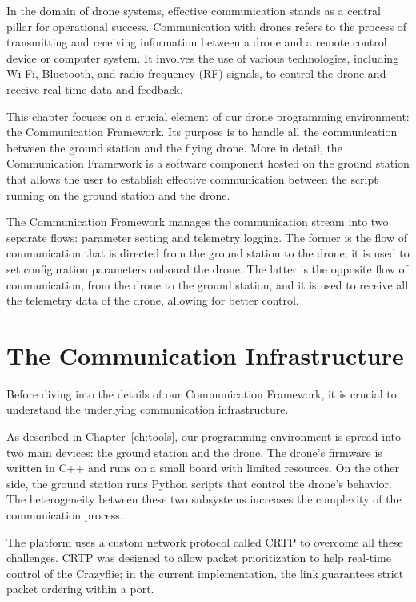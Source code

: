 In the domain of drone systems, effective communication stands as a central pillar for operational success.
Communication with drones refers to the process of transmitting and receiving information between a drone and a remote control device or computer system. 
It involves the use of various technologies, including Wi-Fi, Bluetooth, and radio frequency (RF) signals, to control the drone and receive real-time data and feedback.

This chapter focuses on a crucial element of our drone programming environment: the Communication Framework. 
Its purpose is to handle all the communication between the ground station and the flying drone. 
More in detail, the Communication Framework is a software component hosted on the ground station 
that allows the user to establish effective communication between the script running on the ground station and the drone.

The Communication Framework manages the communication stream into two separate flows: parameter setting and telemetry logging.
The former is the flow of communication that is directed from the ground station to the drone; it is used to set configuration parameters onboard the drone.
The latter is the opposite flow of communication, from the drone to the ground station, and it is used to receive all the telemetry data of the drone, allowing for better control.


\section{The Communication Infrastructure}\label{sec:communication_infrastructure}
Before diving into the details of our Communication Framework, it is crucial to understand the underlying communication infrastructure. 

As described in Chapter~\ref{ch:tools}, our programming environment is spread into two main devices: the ground station and the drone.
The drone's firmware is written in C++ and runs on a small board with limited resources. On the other side, the ground station runs Python scripts
that control the drone's behavior. The heterogeneity between these two subsystems increases the complexity of the communication process.

The platform uses a custom network protocol called CRTP to overcome all these challenges. 
CRTP was designed to allow packet prioritization to help real-time control of the Crazyflie; in the current implementation, the link guarantees strict packet ordering within a port.

